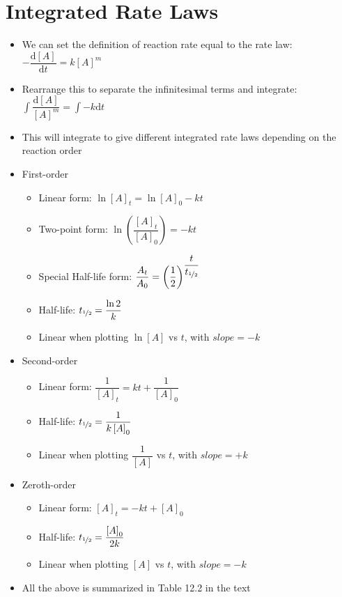 \documentclass[12pt, openany, letterpaper]{memoir}
\begin{document}
\section{Integrated Rate Laws}
\begin{itemize}
  \item We can set the definition of reaction rate equal to the rate law: $-\dfrac{\mathrm{d}\left[A\right]}{\mathrm{d}t}=k\left[A\right]^m$
  \item Rearrange this to separate the infinitesimal terms and integrate: $\int\dfrac{\mathrm{d}\left[A\right]}{\left[A\right]^m}=\int-k\mathrm{d}t$
  \item This will integrate to give different integrated rate laws depending on the reaction order
  \item First-order
    \begin{itemize}
      \item Linear form: $\ln\left[A\right]_t=\ln\left[A\right]_0-kt$
      \item Two-point form: $\ln\left(\dfrac{\left[A\right]_t}{\left[A\right]_0}\right)=-kt$
      \item Special Half-life form: $\dfrac{A_t}{A_0}=\left(\dfrac{1}{2}\right)^{\dfrac{t}{t_{\nicefrac{1}{2}}}}$
      \item Half-life: $t_{\nicefrac{1}{2}}=\dfrac{\ln2}{k}$
      \item Linear when plotting $\ln[A]$ vs $t$, with $slope=-k$
    \end{itemize}
  \item Second-order
    \begin{itemize}
      \item Linear form: $\dfrac{1}{\left[A\right]_t}=kt+\dfrac{1}{\left[A\right]_0}$
      \item Half-life: $t_{\nicefrac{1}{2}}=\dfrac{1}{k\left[A\right]_0}$
      \item Linear when plotting $\dfrac{1}{[A]}$ vs $t$, with $slope=+k$
    \end{itemize}
  \item Zeroth-order
    \begin{itemize}
      \item Linear form: $\left[A\right]_t=-kt+\left[A\right]_0$
      \item Half-life: $t_{\nicefrac{1}{2}}=\dfrac{\left[A\right]_0}{2k}$
      \item Linear when plotting $[A]$ vs $t$, with $slope=-k$
    \end{itemize}
  \item All the above is summarized in Table 12.2 in the text

\end{itemize}
\end{document}
